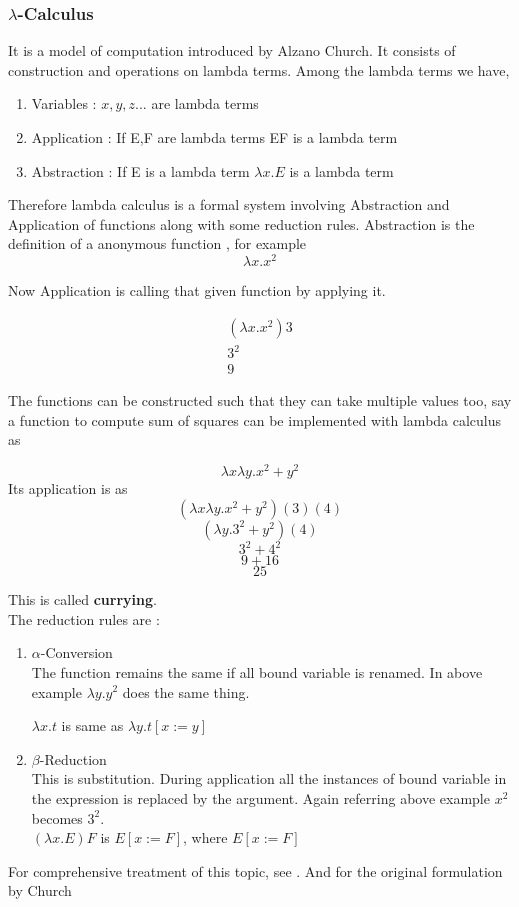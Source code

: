\documentclass[12pt]{article}
\begin{document}
\subsubsection{ $\lambda$-Calculus}
It is a model of computation introduced by Alzano Church. It consists of construction and operations on lambda terms. 
Among the lambda terms we have,
\begin{enumerate}
    \item Variables : $x,y,z ...$ are lambda terms
    \item Application : If E,F are lambda terms EF is a lambda term 
    \item Abstraction : If E is a lambda term $\lambda x. E $ is a lambda term
\end{enumerate}
Therefore lambda calculus is a formal system involving Abstraction and Application of functions along with some reduction rules.
Abstraction is the definition of a anonymous function , for example \\
$$ \lambda x.x^2 $$

Now Application is calling that given function by applying it.

\begin{example}
\begin{align*}
 (\lambda x.x^2) 3\\
 3^2 \\
 9
\end{align*}
\end{example}
The functions can be constructed such that they can take multiple values too, say a function to compute sum of squares can be implemented with lambda calculus as

\begin{example}
    $$\lambda x \lambda y. x^2 +y^2$$
Its application is as 
$$(\lambda x \lambda y. x^2 +y^2) (3) (4)$$
$$(\lambda y. 3^2 + y^2)(4)$$
$$3^2+4^2$$
$$9+16$$
$$25$$
\end{example}

This is called \textbf{currying}.\\
The reduction rules are :

\begin{enumerate}
    \item $\alpha$-Conversion \\
    \indent The function remains the same if all bound variable is renamed.
    In above example $\lambda y. y^2$ does the same thing.

$\lambda x.t$ is same as $ \lambda y.t[x:=y]$
    \item $\beta$-Reduction\\
     This is substitution. During application all the instances of bound variable in the expression is replaced by the argument. Again referring above example $x^2$ becomes $3^2$.\\
     $(\lambda x.E) F$ is $E[x := F]$, where $E[x := F]$
\end{enumerate}
For comprehensive treatment of this topic, see \cite{Rojas2015}. And for the original formulation by Church \cite{}
\end{document}
